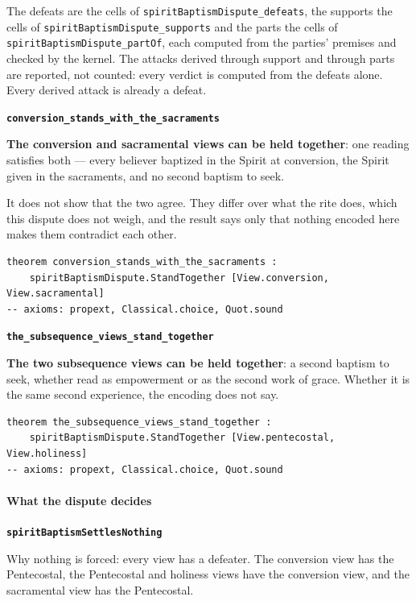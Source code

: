 \documentclass[11pt]{article}
\begin{document}
\noindent The defeats are the cells of \texttt{spirit\allowbreak{}Baptism\allowbreak{}Dispute\_\allowbreak{}defeats}, the supports the cells of \texttt{spirit\allowbreak{}Baptism\allowbreak{}Dispute\_\allowbreak{}supports} and the parts the cells of \texttt{spirit\allowbreak{}Baptism\allowbreak{}Dispute\_\allowbreak{}part\allowbreak{}Of}, each computed from the parties' premises and checked by the kernel. The attacks derived through support and through parts are reported, not counted: every verdict is computed from the defeats alone. Every derived attack is already a defeat.
\par\medskip\noindent\textbf{\texttt{conversion\_\allowbreak{}stands\_\allowbreak{}with\_\allowbreak{}the\_\allowbreak{}sacraments}}\par\nobreak\noindent
\textbf{The conversion and sacramental views can be held together}: one reading satisfies both — every believer baptized in the Spirit at conversion, the Spirit given in the sacraments, and no second baptism to seek.

It does not show that the two agree. They differ over what the rite does, which this dispute does not weigh, and the result says only that nothing encoded here makes them contradict each other.

{\small\begin{verbatim}
theorem conversion_stands_with_the_sacraments :
    spiritBaptismDispute.StandTogether [View.conversion, View.sacramental]
-- axioms: propext, Classical.choice, Quot.sound
\end{verbatim}}
\par\medskip\noindent\textbf{\texttt{the\_\allowbreak{}subsequence\_\allowbreak{}views\_\allowbreak{}stand\_\allowbreak{}together}}\par\nobreak\noindent
\textbf{The two subsequence views can be held together}: a second baptism to seek, whether read as empowerment or as the second work of grace. Whether it is the same second experience, the encoding does not say.

{\small\begin{verbatim}
theorem the_subsequence_views_stand_together :
    spiritBaptismDispute.StandTogether [View.pentecostal, View.holiness]
-- axioms: propext, Classical.choice, Quot.sound
\end{verbatim}}
\paragraph*{What the dispute decides}
\leavevmode\par\nobreak
\par\medskip\noindent\textbf{\texttt{spirit\allowbreak{}Baptism\allowbreak{}Settles\allowbreak{}Nothing}}\par\nobreak\noindent
Why nothing is forced: every view has a defeater. The conversion view has the Pentecostal, the Pentecostal and holiness views have the conversion view, and the sacramental view has the Pentecostal.
\end{document}
